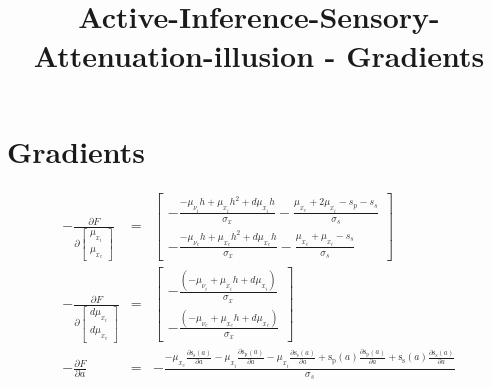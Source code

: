 \documentclass[11pt]{article}
\title{Active-Inference-Sensory-Attenuation-illusion - Gradients}
\begin{document}
\maketitle

\section*{Gradients}

$$
\begin{array}{lll}
  - \frac{\partial F}{\partial \left[\begin{matrix}\mu_{x_i}
\\\mu_{x_e}\end{matrix} \right]} &=& \left[\begin{matrix}- \frac{-
  \mu_{\nu_i} h +  \mu_{x_i} h^{2} + d\mu_{x_i} h}{\sigma_x} - \frac{
  \mu_{x_e} + 2 \mu_{x_i} -  s_{p} - s_{s}}{\sigma_s}\\ - \frac{- \mu_{\nu_e}
  h +  \mu_{x_e} h^{2} + d\mu_{x_e} h}{\sigma_x} - \frac{ \mu_{x_e} +
  \mu_{x_i} -  s_{s}}{\sigma_s} \end{matrix}\right] \\
  - \frac{\partial F}{\partial \left[\begin{matrix}d\mu_{x_i}
  \\d\mu_{x_e}\end{matrix}\right]} &=& \left[\begin{matrix}- \frac{ \left(-
  \mu_{\nu_i} + \mu_{x_i} h + d\mu_{x_i}\right)} {\sigma_x}\\- \frac{ \left(-
  \mu_{\nu_e} + \mu_{x_e} h + d\mu_{x_e}\right)}{\sigma_x} \end{matrix}
  \right] \\
- \frac{\partial F}{\partial a} &=& - \frac{- \mu_{x_e} \frac{\partial
\operatorname{s_{s}}{\left(a \right)}}{\partial a} - \mu_{x_i} \frac{\partial
\operatorname{s_{p}}{\left(a \right)}}{\partial a} - \mu_{x_i} \frac{\partial
\operatorname{s_{s}}{\left(a \right)}}{\partial a} +
\operatorname{s_{p}}{\left(a \right)} \frac{\partial
\operatorname{s_{p}}{\left(a \right)}}{\partial a} +
\operatorname{s_{s}}{\left(a \right)} \frac{\partial
\operatorname{s_{s}}{\left(a \right)}}{\partial a}}{\sigma_s}
\end{array}
$$
\end{document}
